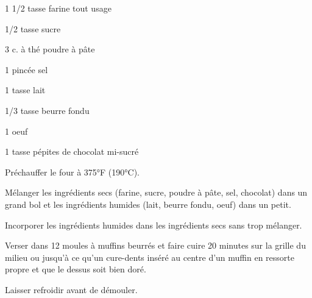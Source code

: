


\totaltime{}


\begin{ingredients}
    \item 1 1/2 tasse farine tout usage
    \item 1/2 tasse sucre
    \item 3 c. à thé poudre à pâte
    \item 1 pincée sel
    \item 1 tasse lait
    \item 1/3 tasse beurre fondu
    \item 1 oeuf
    \item 1 tasse pépites de chocolat mi-sucré
\end{ingredients}

\begin{steps}
    \item Préchauffer le four à 375°F (190°C).
    \item Mélanger les ingrédients secs (farine, sucre, poudre à pâte, sel, chocolat) dans un grand bol et les ingrédients humides (lait, beurre fondu, oeuf) dans un petit.
    \item Incorporer les ingrédients humides dans les ingrédients secs sans trop mélanger.
    \item Verser dans 12 moules à muffins beurrés et faire cuire 20 minutes sur la grille du milieu ou jusqu'à ce qu'un cure-dents inséré au centre d'un muffin en ressorte propre et que le dessus soit bien doré.
    \item Laisser refroidir avant de démouler.
\end{steps}
